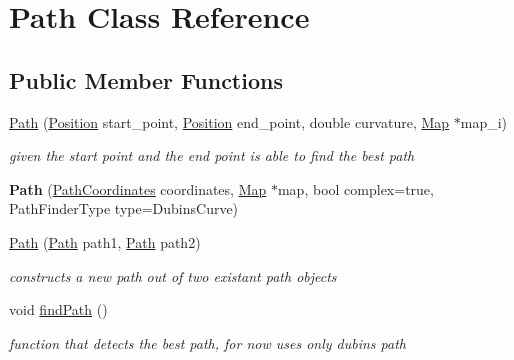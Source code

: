 \hypertarget{class_path}{}\section{Path Class Reference}
\label{class_path}
\subsection*{Public Member Functions}
\begin{DoxyCompactItemize}
\item 
\mbox{\hyperlink{class_path_a6abfa12b45ae127daa7408571b62b74d}{Path}} (\mbox{\hyperlink{class_position}{Position}} start\+\_\+point, \mbox{\hyperlink{class_position}{Position}} end\+\_\+point, double curvature, \mbox{\hyperlink{class_map}{Map}} $\ast$map\+\_\+i)
\begin{DoxyCompactList}\small\item\em given the start point and the end point is able to find the best path \end{DoxyCompactList}\item 
\mbox{\label{class_path_a328c21221c311c4f33adca6dbb1fe152}} 
{\bfseries Path} (\mbox{\hyperlink{class_path_coordinates}{Path\+Coordinates}} coordinates, \mbox{\hyperlink{class_map}{Map}} $\ast$map, bool complex=true, Path\+Finder\+Type type=Dubins\+Curve)
\item 
\mbox{\label{class_path_ad2148acf78204e74c45bd593f63d6c29}} 
\mbox{\hyperlink{class_path_ad2148acf78204e74c45bd593f63d6c29}{Path}} (\mbox{\hyperlink{class_path}{Path}} path1, \mbox{\hyperlink{class_path}{Path}} path2)
\begin{DoxyCompactList}\small\item\em constructs a new path out of two existant path objects \end{DoxyCompactList}\item 
\mbox{\label{class_path_ab45faf702862c6594068a3ed2d026cda}} 
void \mbox{\hyperlink{class_path_ab45faf702862c6594068a3ed2d026cda}{find\+Path}} ()
\begin{DoxyCompactList}\small\item\em function that detects the best path, for now uses only dubins path \end{DoxyCompactList}\item 
\mbox{\label{class_path_ad5d38a9684c07019370a856d29b32538}} 

\end{DoxyCompactItemize}
